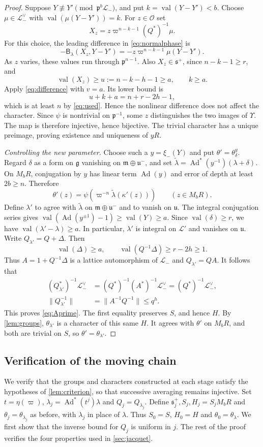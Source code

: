 \documentclass[11pt,reqno]{amsart}
\numberwithin{equation}{section}
\theoremstyle{plain}
\theoremstyle{definition}
\theoremstyle{remark}
\theoremstyle{plain}
\newcommand{\OO}{\mathcal{O}}    %
\newcommand{\pp}{\mathfrak{p}}   %
\newcommand{\Lat}{\mathcal{L}}   %
\newcommand{\g}{\mathfrak{g}}    %
\newcommand{\uu}{\mathfrak{u}}   %
\newcommand{\m}{\mathfrak{m}}    %
\newcommand{\sS}{\mathfrak{s}^+}   %
\newcommand{\norm}[1]{\lVert#1\rVert}
\DeclareMathOperator{\Ad}{Ad}
\DeclareMathOperator{\val}{val}
\newcommand{\lf}{\lambda}
\newcommand{\Bf}{\mathsf{B}}
\begin{document}
\begin{proof}
Suppose $Y\not\equiv Y'\pmod{\pp^b\Lat_-}$, and put
$k=\val(Y-Y')<b$. Choose $\mu\in\Lat_-^\vee$ with
$\val(\mu(Y-Y'))=k$. For $z\in\OO$ set
\[
X_z=z\varpi^{n-k-1}(Q^*)^{-1}\mu.
\]
For this choice, the leading difference in \eqref{eq:normalphase} is
\[
-\Bf_\lf(X_z,Y-Y')=-z\varpi^{n-k-1}\mu(Y-Y').
\]
As $z$ varies, these values run through $\pp^{n-1}$.
Also $X_z\in\sS$, since $n-k-1\ge r$, and
\[
\val(X_z)\ge u:=n-k-h-1\ge a,\qquad k\ge a.
\]
Apply \eqref{eq:difference} with $v=a$. Its lower bound is
\[
u+k+a=n+r-2h-1,
\]
which is at least $n$ by \eqref{eq:used}. Hence the nonlinear
difference does not affect the character. Since $\psi$ is nontrivial
on $\pp^{-1}$, some $z$ distinguishes the two images of
$\Upsilon$. The map is therefore injective, hence bijective. The
trivial character has a unique preimage, proving existence and
uniqueness of $yR$.

\smallskip\noindent\emph{Controlling the new parameter.}
Choose such a $y=\xi_-(Y)$ and put $\theta'=\theta_\delta^y$.
Regard $\delta$ as a form on $\g$ vanishing on $\m\oplus\uu^-$,
and set $\tilde\lf=\Ad^*(y^{-1})(\lf+\delta)$.
On $M_bR$, conjugation by $y$ has linear term $\Ad(y)$ and error
of depth at least $2b\ge n$. Therefore
\[
\theta'(z)=\psi(\varpi^{-n}\tilde\lf(\kappa'(z)))
\qquad(z\in M_bR).
\]
Define $\lf'$ to agree with $\tilde\lf$ on $\m\oplus\uu^-$ and
to vanish on $\uu$. The integral conjugation series gives
$\val(\Ad(y^{\pm1})-1)\ge\val(Y)\ge a$. Since $\val(\delta)\ge r$,
we have $\val(\lf'-\lf)\ge a$. In particular, $\lf'$ is integral
on $\Lat'$ and vanishes on $\uu$.
Write $Q_{\lf'}=Q+\Delta$. Then
\[
\val(\Delta)\ge a,\qquad
\val(Q^{-1}\Delta)\ge r-2h\ge1.
\]
Thus $A=1+Q^{-1}\Delta$ is a lattice automorphism of $\Lat_-$
and $Q_{\lf'}=QA$. It follows that
\[
\begin{aligned}
(Q_{\lf'}^*)^{-1}\Lat_-^\vee
&=(Q^*)^{-1}(A^*)^{-1}\Lat_-^\vee
=(Q^*)^{-1}\Lat_-^\vee,\\
\norm{Q_{\lf'}^{-1}}&=\norm{A^{-1}Q^{-1}}\le q^h.
\end{aligned}
\]
This proves \eqref{eq:Aprime}. The first equality preserves $S$,
and hence $H$. By \cref{lem:groups}, $\theta_{\lf'}$ is a character
of this same $H$. It agrees with $\theta'$ on $M_bR$, and both are
trivial on $S$, so $\theta'=\theta_{\lf'}$.
\end{proof}

\subsection{Verification of the moving chain}\label{sec:chaindetails}
We verify that the groups and characters constructed at each stage
satisfy the hypotheses of \cref{lem:criterion}, so that successive
averaging remains injective.
Set $t=\eta(\varpi)$, $\lf_j=\Ad^*(t^j)\lf$ and
$Q_j=Q_{\lf_j}$. Define $\sS_j,S_j,H_j=S_jM_bR$ and
$\theta_j=\theta_{\lf_j}$ as before, with $\lf_j$ in place of
$\lf$. Thus $S_0=S$, $H_0=H$ and $\theta_0=\theta_\lf$.
We first show that the inverse bound for $Q_j$ is uniform in $j$.
The rest of the proof verifies the four properties used in
\cref{sec:jacquet}.
\end{document}
